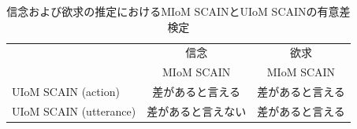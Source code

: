 \begin{table}[htb]
  \begin{center}
  \caption{信念および欲求の推定におけるMIoM SCAINとUIoM SCAINの有意差検定}
  \label{tab:test}
  \begin{tabular}{lcc} \hline
    &信念&欲求\\\cline{2-3}
    & \hspace{10pt} MIoM SCAIN \hspace{10pt} & \hspace{10pt} MIoM SCAIN \hspace{10pt} \\ \hline
    UIoM SCAIN (action)&差があると言える&差があると言える\\
    UIoM SCAIN (utterance)&差があると言えない&差があると言える\\\hline
  \end{tabular}
\end{center}
\end{table}
